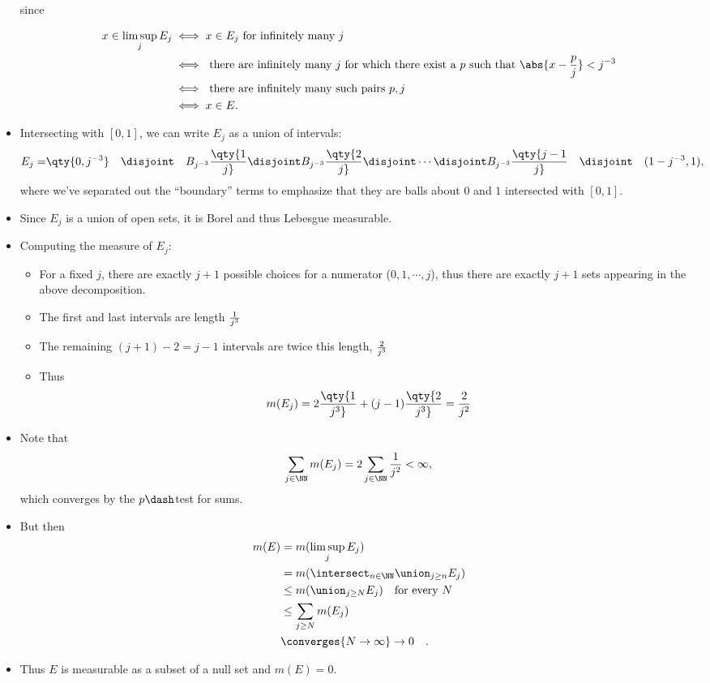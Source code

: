 \begin{solution}
\begin{itemize}
  since

  \begin{align*}
  x \in \limsup_j E_j 
  &\iff x \in E_j \text{ for infinitely many } j  \\
  &\iff \text{ there are infinitely many $j$ for which there exist a $p$ such that } \abs{x - {p\over j}} < j^{-3}  \\
  &\iff \text{ there are infinitely many such pairs $p, j$}  \\
  &\iff x\in E
  .\end{align*}
\item
  Intersecting with \([0, 1]\), we can write \(E_j\) as a union of
  intervals:
  \begin{align*}
  E_j =& \qty{0, {j^{-3}}} 
  \quad \disjoint \quad 
  B_{j^{-3}}\qty{1\over j} \disjoint
  B_{j^{-3}}\qty{2\over j} \disjoint
  \cdots \disjoint
  B_{j^{-3}}\qty{j-1\over j} 
  \quad \disjoint \quad 
  (1 - {j^{-3}}, 1)
  ,\end{align*} where we've separated out the ``boundary'' terms to
  emphasize that they are balls about \(0\) and \(1\) intersected with
  \([0, 1]\).
\item
  Since \(E_j\) is a union of open sets, it is Borel and thus Lebesgue
  measurable.
\item
  Computing the measure of \(E_j\):

  \begin{itemize}
  \item
    For a fixed \(j\), there are exactly \(j+1\) possible choices for a
    numerator (\(0, 1, \cdots, j\)), thus there are exactly \(j+1\) sets
    appearing in the above decomposition.
  \item
    The first and last intervals are length \(1 \over j^3\)
  \item
    The remaining \((j+1)-2 = j-1\) intervals are twice this length,
    \(2 \over j^3\)
  \item
    Thus
    \begin{align*}
    m(E_j) = 2 \qty{1 \over j^3} + (j-1) \qty{2 \over j^3} = {2 \over j^2}
    \end{align*}
  \end{itemize}
\item
  Note that
  \begin{align*}
  \sum_{j\in \NN} m(E_j) =  2\sum_{j\in \NN} \frac 1 {j^2} < \infty
  ,\end{align*} which converges by the \(p\dash\)test for sums.
\item
  But then
  \begin{align*}
  m(E) 
  &= m(\limsup_j E_j) \\
  &= m(\intersect_{n\in \NN} \union_{j\geq n} E_j) \\
  &\leq m(\union_{j\geq N} E_j) \quad\text{for every } N \\
  &\leq \sum_{j\geq N} m(E_j) \\
  &\converges{N\to\infty}\to 0 \quad\text{}
  .\end{align*}
\item
  Thus \(E\) is measurable as a subset of a null set and \(m(E) = 0\).
\end{itemize}


\end{solution}
